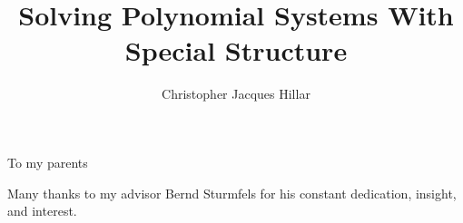 \documentclass{ucthesis}
\title{Solving Polynomial Systems With Special Structure}
\author{Christopher Jacques Hillar}
\numberwithin{equation}{subsection}
\newcommand{\<}{\langle}
\renewcommand{\>}{\rangle}
\theoremstyle{remark}
\begin{document}





\maketitle
\approvalpage
\copyrightpage
\pagestyle{fancyplain}

\pagestyle{plain}
\begin{frontmatter}
\begin{dedication}
\null\vfil
{\large
\begin{center}
To my parents
\end{center}}
\vfil\null
\end{dedication}
 
\tableofcontents
\lhead[\fancyplain{}{}]{\fancyplain{}{}}
\rhead[\fancyplain{}{}]{\fancyplain{}{}}

\begin{acknowledgements}

Many thanks to my advisor Bernd Sturmfels for his constant dedication, insight, and interest.

\end{acknowledgements}

\end{frontmatter}




\renewcommand{\chaptermark}[1]{\markboth{\chaptername\thechapter. #1}{}}
\rhead[\fancyplain{}{\bfseries \leftmark}]{\fancyplain{}{\bfseries \thepage}}









%

\rhead[\fancyplain{}{}]{\fancyplain{}{}}



\end{document}
